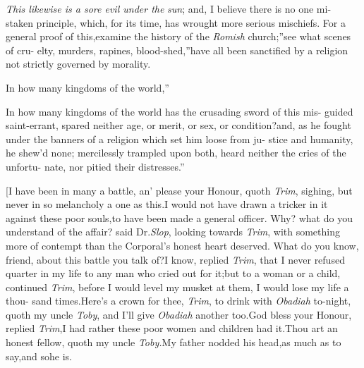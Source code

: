 \documentclass{article}
\begin{document}
\lqq \textit{This likewise is a sore evil under the}\break
\lqq \textit{sun}; and, I believe there is no one mi-\break
\lqq staken principle, which, for its time,\break
\lqq has wrought more serious mischiefs.\tsh\break
\lqq For a general proof of this,\tsk examine\break
\lqq the history of the \textit{Romish} church;”\tsk{}\tsk \lqq see what scenes of cru-\break
\lqq elty, murders, rapines, blood-shed,” \lqq have all been sanctified\break
\lqq by a religion not strictly governed by\break
\lqq morality.\\
\newpage

\lqq In how many kingdoms of the world,”

\lqq In how many kingdoms of the world\break
\lqq has the crusading sword of this mis-\break
\lqq guided saint-errant, spared neither age,\break
\lqq or merit, or sex, or condition?\tsk and,\break
\lqq as he fought under the banners of a\break
\lqq religion which set him loose from ju-\break
\lqq stice and humanity, he shew’d none;\break
\lqq mercilessly trampled upon both,\tsh\break
\lqq heard neither the cries of the unfortu-\break
\lqq nate, nor pitied their distresses.”

[I have been in many a battle, an’ please your Honour, quoth \textit{Trim},
sighing, but never in so melancholy a one as this.\tsk I would not have drawn
a tricker
in it against these poor souls,\tsh to have been made a general
officer.\tsh\break 
Why? what do you understand of the affair?
said Dr.\@ \textit{Slop}, looking towards \textit{Trim}, with
something more of contempt than the Corporal’s honest heart
deserved.\tsh\break 
What do you know, friend, about this battle
you talk of?\tsh I know, replied \textit{Trim}, that I never
refused quarter in my life to any man who cried out for
it;\tsh\break but to a woman or a child, continued
\textit{Trim}, before I would level my musket\break
at them, I would lose my life a thou-\break
sand times.\tsk Here’s a crown for thee,\break
\textit{Trim}, to drink with \textit{Obadiah} to-night,\break
quoth my
uncle \textit{Toby}, and I’ll give \textit{Obadiah} another
too.\tsk God bless your Honour, replied \textit{Trim},\tsh I had
rather these poor women and children had it.\tsh\break Thou art
an honest fellow, quoth my\break
uncle \textit{Toby.}\tsh My father
nodded his 
head,\tsh as much as to say,\tsh and so\break he is.\tsh
\end{document}
